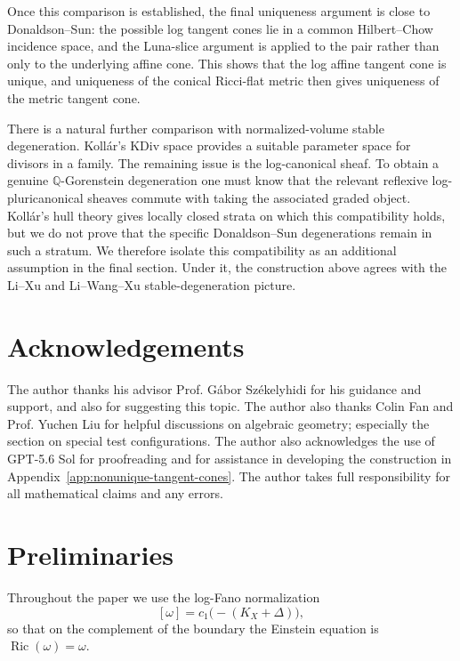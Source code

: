 \documentclass[11pt]{amsart}
\theoremstyle{definition}
\theoremstyle{remark}
\begin{document}
Once this comparison is established, the final uniqueness argument is close to
Donaldson--Sun: the possible log tangent cones lie in a common Hilbert--Chow
incidence space, and the Luna-slice argument is applied to the pair rather than
only to the underlying affine cone. This shows that the log affine tangent cone
is unique, and uniqueness of the conical Ricci-flat metric then gives uniqueness
of the metric tangent cone.

There is a natural further comparison with normalized-volume stable
degeneration. Koll\'ar's KDiv space provides a suitable parameter space for divisors in a family. The remaining issue is the log-canonical sheaf. To obtain a genuine
$\mathbb Q$-Gorenstein degeneration one must know that the relevant reflexive
log-pluricanonical sheaves commute with taking the associated graded object.
Koll\'ar's hull theory gives locally closed strata on which this compatibility
holds, but we do not prove that the specific Donaldson--Sun degenerations remain
in such a stratum. We therefore isolate this compatibility as an additional
assumption in the final section. Under it, the construction above agrees with
the Li--Xu and Li--Wang--Xu stable-degeneration picture.
\section*{Acknowledgements}

The author thanks his advisor Prof. Gábor Székelyhidi for his guidance and support, and also for suggesting this topic. The author also thanks
Colin Fan and Prof. Yuchen Liu for helpful discussions on algebraic geometry; especially the section on special test configurations. The author also acknowledges the use of GPT-5.6 Sol for proofreading and for assistance in developing the construction in Appendix~\ref{app:nonunique-tangent-cones}. The author takes full responsibility for all mathematical claims and any errors.


\section{Preliminaries}

Throughout the paper we use the log-Fano normalization
\[
        [\omega]=c_1\bigl(-(K_X+\Delta)\bigr),
\]
so that on the complement of the boundary the Einstein equation is
$\operatorname{Ric}(\omega)=\omega$.
\end{document}
